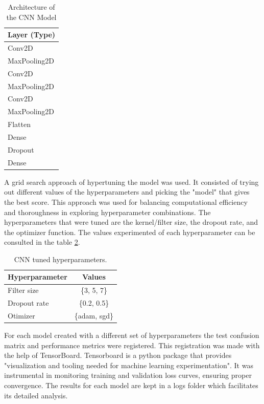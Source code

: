 \begin{table}[H]
\centering
\caption{Architecture of the CNN Model}
\begin{tabular}{|l|}
\hline
\textbf{Layer (Type)}\\ \hline
Conv2D                      \\ \hline
MaxPooling2D                \\ \hline
Conv2D                      \\ \hline
MaxPooling2D                \\ \hline
Conv2D                      \\ \hline
MaxPooling2D                \\ \hline
Flatten                     \\ \hline
Dense                       \\ \hline
Dropout                     \\ \hline
Dense                  \\
\hline
\end{tabular}
\label{tab:cnn_architecture_2}
\end{table}

A grid search approach of hypertuning the model was used. It consisted of trying out different values of the hyperparameters and picking the "model" that gives the best score. This approach was used for balancing computational efficiency and thoroughness in exploring hyperparameter combinations. The hyperparameters that were tuned are the kernel/filter size, the dropout rate, and the optimizer function. The values experimented of each hyperparameter can be consulted in the table \ref{tab:cnn_hypertuning}.

\begin{table}[H]
\centering
\caption{CNN tuned hyperparameters.}
\begin{tabular}{|l|c|}
\hline
\textbf{Hyperparameter} & \textbf{Values} \\ \hline
Filter size & \{3, 5, 7\} \\ \hline
Dropout rate & \{0.2, 0.5\} \\ \hline
Otimizer & \{adam, sgd\} \\ \hline
\end{tabular}
\label{tab:cnn_hypertuning}
\end{table}

For each model created with a different set of hyperparameters the test confusion matrix and performance metrics were registered. This registration was made with the help of TensorBoard. Tensorboard is a python package that provides "visualization and tooling needed for machine learning experimentation"\cite{tensorboard}. It was instrumental in monitoring training and validation loss curves, ensuring proper convergence. The results for each model are kept in a logs folder which facilitates its detailed analysis.

